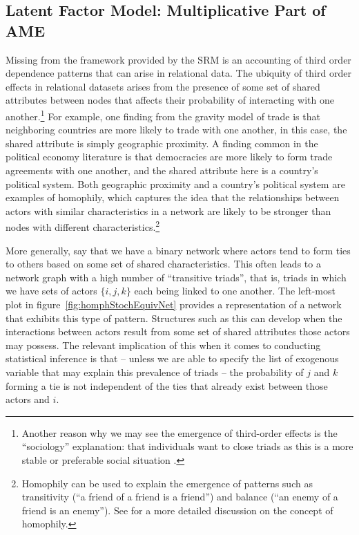 \subsection{Latent Factor Model: Multiplicative Part of AME}

Missing from the framework provided by the SRM is an accounting of third order dependence patterns that can arise in relational data. The ubiquity of third order effects in relational datasets arises from the presence of some set of shared attributes between nodes that affects their probability of interacting with one another.\footnote{Another reason why we may see the emergence of third-order effects is the ``sociology'' explanation: that individuals want to close triads as this is a more stable or preferable social situation \citep{wasserman:faust:1994}.} For example, one finding from the gravity model of trade is that neighboring countries are more likely to trade with one another, in this case, the shared attribute is simply geographic proximity. A finding common in the political economy literature is that democracies are more likely to form trade agreements with one another, and the shared attribute here is a country's political system. Both geographic proximity and a country's political system are examples of homophily, which captures the idea that the relationships between actors with similar characteristics in a network are likely to be stronger than nodes with different characteristics.\footnote{Homophily can be used to explain the emergence of patterns such as transitivity (``a friend of a friend is a friend'') and balance (``an enemy of a friend is an enemy''). See \citet{shalizi:thomas:2011} for a more detailed discussion on the concept of homophily.} 

More generally, say that we have a binary network where actors tend to form ties to others based on some set of shared characteristics. This often leads to a network graph with a high number of ``transitive triads'', that is, triads in which we have sets of actors $\{i,j,k\}$ each being linked to one another. The left-most plot in figure~\ref{fig:homphStochEquivNet} provides a representation of a network that exhibits this type of pattern. Structures such as this can develop when the interactions between actors result from some set of shared attributes those actors may possess. The relevant implication of this when it comes to conducting statistical inference is that -- unless we are able to specify the list of exogenous variable that may explain this prevalence of triads -- the probability of $j$ and $k$ forming a tie is not independent of the ties that already exist between those actors and $i$. 

